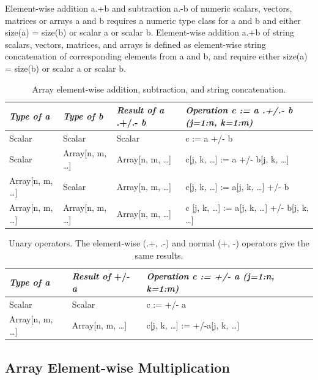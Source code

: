 \documentclass[10pt,a4paper]{report}
\def\doublelabel#1{\label{#1}\hypertarget{#1}{}}
\begin{document}
Element-wise addition a.+b and subtraction a.-b of numeric scalars,
vectors, matrices or arrays a and b requires a numeric type class for a
and b and either size(a) = size(b) or scalar a or scalar b. Element-wise
addition a.+b of string scalars, vectors, matrices, and arrays is
defined as element-wise string concatenation of corresponding elements
from a and b, and require either size(a) = size(b) or scalar a or scalar
b.

\begin{longtable}[]{|l|l|l|l|}
\caption{Array element-wise addition, subtraction, and string concatenation.}\\
\hline
\emph{Type of a} & \emph{Type of b} & \emph{Result of a} .+/.- \emph{b}
& \emph{Operation c := a .+/.- b (j=1:n, k=1:m)}\\ \hline
\endhead
Scalar & Scalar & Scalar & c := a +/- b\\ \hline
Scalar & Array{[}n, m, \ldots{}{]} & Array{[}n, m, \ldots{}{]} & c{[}j,
k, \ldots{}{]} := a +/- b{[}j, k, \ldots{}{]}\\ \hline
Array{[}n, m, \ldots{}{]} & Scalar & Array{[}n, m, \ldots{}{]} & c{[}j,
k, \ldots{}{]} := a{[}j, k, \ldots{}{]} +/- b\\ \hline
Array{[}n, m, \ldots{}{]} & Array{[}n, m, \ldots{}{]} & Array{[}n, m,
\ldots{}{]} & c {[}j, k, \ldots{}{]} := a{[}j, k, \ldots{}{]} +/- b{[}j,
k, \ldots{}{]}\\ \hline

\end{longtable}

\begin{longtable}[]{|l|l|l|}
\caption{Unary operators. The element-wise (.+, .-) and normal (+, -) operators give the same results.}\\
\hline
\emph{Type of a} & \emph{Result of} +/- \emph{a} & \emph{Operation c :=
+/- a (j=1:n, k=1:m)}\\ \hline
\endhead
Scalar & Scalar & c := +/- a\\ \hline
Array{[}n, m, \ldots{}{]} & Array{[}n, m, \ldots{}{]} & c{[}j, k,
\ldots{}{]} := +/-a{[}j, k, \ldots{}{]}\\ \hline

\end{longtable}

\subsection{Array Element-wise Multiplication}\doublelabel{array-element-wise-multiplication}
\end{document}
